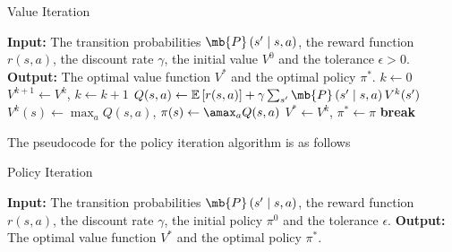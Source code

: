 \begin{exercise}
\begin{enumerate}
\begin{solution}
\begin{center}
\begin{minipage}{.8\linewidth}
\begin{algorithm}[H]
                            \caption{Value Iteration}
                            \label{alg:vi}
                            \begin{algorithmic}[1]
                                \STATE \textbf{Input:} The transition probabilities $\mb{P}\left(s' \mid s,a\right)$, the reward function $r(s, a)$, the discount rate $\gamma$, the initial value $V^0$ and the tolerance $\epsilon > 0$.
                                \STATE \textbf{Output:} The optimal value function $V^*$ and the optimal policy $\pi^*$.
                                \STATE $k \gets 0$
                                \LOOP
                                \STATE $V^{k+1} \gets V^k$, $k \gets k+1$
                                \STATE $Q(s, a) \gets \mathbb{E}\left[r(s, a)\right] + \gamma \sum_{s'}\mb{P}\left(s' \mid s, a\right) V^k(s')$
                                \ENDFOR
                                \STATE $V^k(s) \gets \max_{a} Q(s,a)$, $\pi(s) \gets \amax_{a} Q(s,a)$
                                \ENDFOR
                                \STATE $V^* \gets V^k$, $\pi^* \gets \pi$
                                \STATE \textbf{break}
                                \ENDIF
                                \ENDLOOP
                            \end{algorithmic}
                        \end{algorithm}
                    \end{minipage}
                \end{center}
                The pseudocode for the policy iteration algorithm is as follows
                \begin{center}
                    \begin{minipage}{.8\linewidth}
                        \begin{algorithm}[H]
                            \caption{Policy Iteration}
                            \label{alg:pi}
                            \begin{algorithmic}[1]
                                \STATE \textbf{Input:} The transition probabilities $\mb{P}\left(s' \mid s,a\right)$, the reward function $r(s,a)$, the discount rate $\gamma$, the initial policy $\pi^0$ and the tolerance $\epsilon$.
                                \STATE \textbf{Output:} The optimal value function $V^*$ and the optimal policy $\pi^*$.

\end{algorithmic}
\end{algorithm}
\end{minipage}
\end{center}
\end{solution}
\end{enumerate}
\end{exercise}
